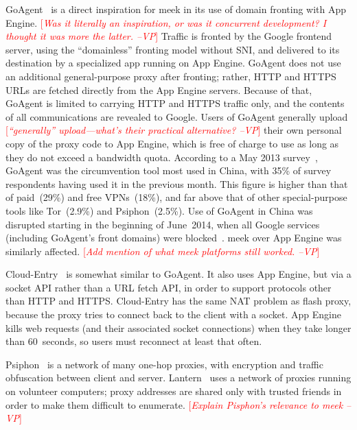\documentclass{sig-alternate}
\newcommand{\meek}{meek\xspace}
\newcommand{\note}[1]{{\textcolor{red}{[\textit{#1}]}}}
\newcommand{\vp}[1]{\note{#1 --VP}}
\begin{document}
GoAgent~\cite{goagent} is a direct inspiration for \meek in its use of
domain fronting with App Engine.
\vp{Was it literally an inspiration, or was it concurrent development?
I thought it was more the latter.}
Traffic is fronted by the Google frontend server,
using the ``domainless'' fronting model without SNI,
and delivered to its destination by a specialized app running on App Engine.
GoAgent does not use an additional general-purpose proxy after fronting;
rather, HTTP and HTTPS URLs are fetched directly from the App Engine servers.
Because of that, GoAgent is limited to carrying HTTP and HTTPS traffic only,
and the contents of all communications are revealed to Google.
Users of GoAgent generally upload
\vp{``generally'' upload---what's their practical alternative?}
their own personal copy of the proxy code to App Engine,
which is free of charge to use as long as they do not exceed a bandwidth quota.
According to a May 2013 survey~\cite{collateral-freedom},
GoAgent was the circumvention tool most used in
China, with 35\% of survey respondents having used it in the previous month.
This figure is higher than that of paid~(29\%) and free VPNs~(18\%), and far
above that of other special-purpose tools like Tor~(2.9\%) and Psiphon~(2.5\%).
Use of GoAgent in China was disrupted starting in the beginning of June~2014,
when all Google services (including GoAgent's front domains) were blocked~\cite{cn-google-block}.
\meek over App Engine was similarly affected.
\vp{Add mention of what \meek platforms still worked.}

Cloud-Entry~\cite{cloud-entry} is somewhat similar to GoAgent.
It also uses App Engine, but via a socket API rather than a URL fetch API,
in order to support protocols other than HTTP and HTTPS.
Cloud-Entry has the same NAT problem as flash proxy,
because the proxy tries to connect back to the client with a socket.
App Engine kills web requests (and their associated socket connections)
when they take longer than 60~seconds,
so users must reconnect at least that often.

Psiphon~\cite{psiphon} is a network of many one-hop proxies,
with encryption and traffic obfuscation between client and server.
Lantern~\cite{lantern} uses a network of proxies running on volunteer computers;
proxy addresses are shared only with trusted friends in order to make them difficult to enumerate.
\vp{Explain Pisphon's relevance to meek}
\end{document}
